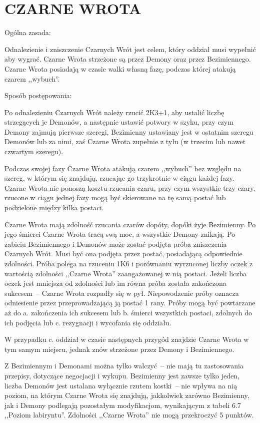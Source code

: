 \section{CZARNE WROTA}

Ogólna zasada:

Odnalezienie i zniszczenie Czarnych Wrót jest celem, który oddział musi wypełnić aby wygrać.
Czarne Wrota strzeżone są przez Demony oraz przez Bezimiennego.
Czarne Wrota posiadają w czasie walki własną fazę, podczas której atakują czarem ,,wybuch''.

Sposób postępowania:

Po odnalezieniu Czarnych Wrót należy rzucić 2K3+1, aby ustalić liczbę strzegących je Demonów, a następnie ustawić potwory w szyku, przy czym Demony zajmują pierwsze szeregi, Bezimienny ustawiany jest w ostatnim szeregu Demonów lub za nimi, zaś Czarne Wrota zupełnie z tyłu (w trzecim lub nawet czwartym szeregu).

Podczas swojej fazy Czarne Wrota atakują czarem ,,wybuch'' bez względu na szereg, w którym się znajdują, rzucając go trzykrotnie w ciągu każdej fazy.
Czarne Wrota nie ponoszą kosztu rzucania czaru, przy czym wszystkie trzy czary, rzucone w ciągu jednej fazy mogą być skierowane na tę samą postać lub podzielone między kilka postaci.

Czarne Wrota mają zdolność rzucania czarów dopóty, dopóki żyje Bezimienny.
Po jego śmierci Czarne Wrota tracą swą moc, a wszystkie Demony znikają.
Po zabiciu Bezimiennego i Demonów może zostać podjęta próba zniszczenia Czarnych Wrót.
Musi być ona podjęta przez postać, posiadającą odpowiednie zdolności.
Próba polega na rzuceniu 1K6 i porównaniu wyrzuconej liczby oczek z wartością zdolności ,,Czarne Wrota'' zaangażowanej w nią postaci.
Jeżeli liczba oczek jest mniejsza od zdolności lub im równa próba została zakończona sukcesem~-- Czarne Wrota rozpadły się w pył.
Niepowodzenie próby oznacza odniesienie przez przeprowadzającą ją postać 1 rany.
Próby mogą być powtarzane aż do
a. zakończenia ich sukcesem lub
b. śmierci wszystkich postaci, zdolnych do ich podjęcia lub
c. rezygnacji i wycofania się oddziału.

W przypadku c. oddział w czasie następnych przygód znajdzie Czarne Wrota w tym samym miejscu, jednak znów strzeżone przez Demony i Bezimiennego.

Z Bezimiennym i Demonami można tylko walczyć~-- nie mają tu zastosowania przepisy, dotyczące negocjacji i wykupu.
Bezimienny jest zawsze tylko jeden, liczba Demonów jest ustalana wyłącznie rzutem kostki~-- nie wpływa na nią poziom, na którym Czarne Wrota się znajdują, jakkolwiek zarówno Bezimienny, jak i Demony podlegają pozostałym modyfikacjom, wynikającym z tabeli 6.7 ,,Poziom labiryntu''.
Zdolności ,,Czarne Wrota'' nie mogą przekroczyć 5 punktów.
